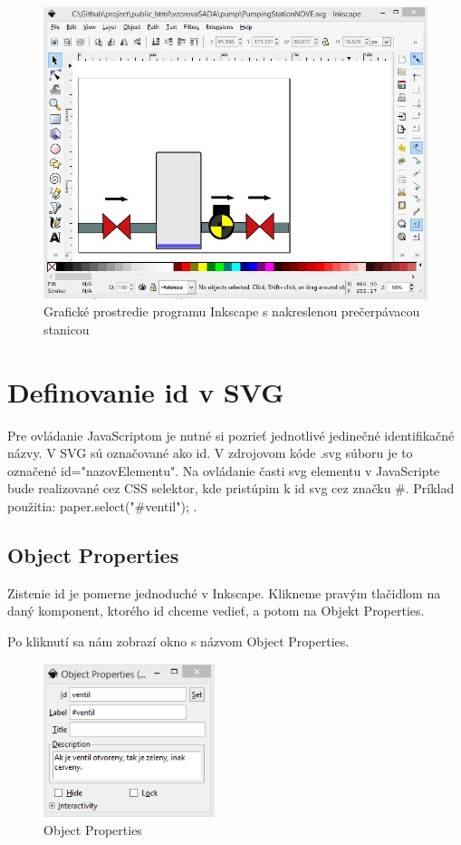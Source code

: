 \begin{figure}[H]
	\begin{center}
		\includegraphics[width=0.7\linewidth] {obrazky/pump1.jpg}
		\caption{Grafické prostredie programu Inkscape s nakreslenou prečerpávacou stanicou}
		\label{picture1}
	\end{center}
\end{figure}


\section{Definovanie id v SVG}

Pre ovládanie JavaScriptom je nutné si pozrieť jednotlivé jedinečné identifikačné názvy. V SVG sú označované ako id. V zdrojovom kóde .svg súboru je to označené id="nazovElementu". Na ovládanie časti svg elementu v JavaScripte bude realizované cez CSS selektor, kde pristúpim k id svg cez značku \#. 
Príklad použitia: paper.select("\#ventil"); .


\subsection{Object Properties}
Zistenie id je pomerne jednoduché v Inkscape. Klikneme pravým tlačidlom na daný komponent, ktorého id chceme vedieť, a potom na Objekt Properties.

Po kliknutí sa nám zobrazí okno s názvom Object Properties. 

\begin{figure}[H]
	\begin{center}
		\includegraphics [width=5cm]  {obrazky/obr3.png}
		\caption{Object Properties}
		\label{picture3}
	\end{center}
\end{figure}


